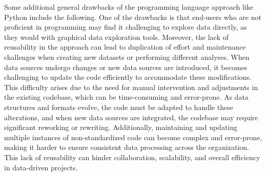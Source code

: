 Some additional general drawbacks of the programming language approach like Python include the following. One of the drawbacks is that end-users who are not proficient in programming may find it challenging to explore data directly, as they would with graphical data exploration tools. Moreover, the lack of reusability in the approach can lead to duplication of effort and maintenance challenges when creating new datasets or performing different analyses. When data sources undergo changes or new data sources are introduced, it becomes challenging to update the code efficiently to accommodate these modifications. This difficulty arises due to the need for manual intervention and adjustments in the existing codebase, which can be time-consuming and error-prone. As data structures and formats evolve, the code must be adapted to handle these alterations, and when new data sources are integrated, the codebase may require significant reworking or rewriting. Additionally, maintaining and updating multiple instances of non-standardized code can become complex and error-prone, making it harder to ensure consistent data processing across the organization. This lack of reusability can hinder collaboration, scalability, and overall efficiency in data-driven projects. 

